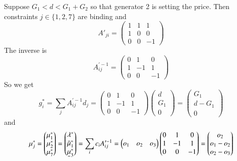 \documentclass[final,3p,times]{elsarticle}
\newcommand{\ubar}[1]{\text{\b{$#1$}}}
\def\l{\lambda}
\def\m{\mu}
\begin{document}
Suppose $G_1 < d < G_1+G_2$ so that generator 2 is setting the price. Then constraints $j\in \{1,2,7\}$ are binding and
\begin{equation}
A'_{ji}=\left(\begin{matrix}
 1 & 1 & 1\\
 1 & 0 & 0\\
 0 & 0 & -1
\end{matrix}\right)
\end{equation}
The inverse is
\begin{equation}
 A^{\prime -1}_{ij}
=\left(\begin{matrix}
 0 & 1 & 0\\
 1 & -1 & 1\\
 0 & 0 & -1
\end{matrix}\right)
\end{equation}
So we get
\begin{equation}
g^*_i = \sum_j A^{\prime -1}_{ij} d_j
=\left(\begin{matrix}
 0 & 1 & 0\\
 1 & -1 & 1\\
 0 & 0 & -1
\end{matrix}\right)\left(\begin{matrix}
 d\\
 G_1\\
 0
\end{matrix}\right) = \left(\begin{matrix}
 G_1\\
 d-G_1\\
 0
\end{matrix}\right)
\end{equation}
and
\begin{equation}
\m^*_j =\left(\begin{matrix}
 \m^*_1\\
 \m^*_2\\
 \m^*_7
\end{matrix}\right) =\left(\begin{matrix}
 \l^*\\
 \bar{\m}^*_1\\
 \ubar{\m}^*_3
\end{matrix}\right) = \sum_i c_i A^{\prime -1}_{ij}
= \left(\begin{matrix}
 o_1 &
 o_2 &
 o_3
\end{matrix}\right) \left(\begin{matrix}
 0 & 1 & 0\\
 1 & -1 & 1\\
 0 & 0 & -1
\end{matrix}\right) = \left(\begin{matrix}
 o_2\\
 o_1-o_2\\
 o_2-o_3
\end{matrix}\right)
\end{equation}
\end{document}
